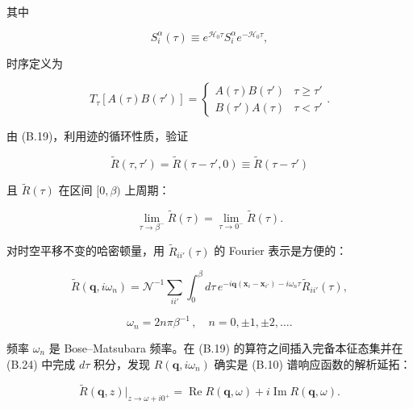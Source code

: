 其中

\begin{equation*}
S _ {i} ^ {\alpha} ( \tau ) \equiv e ^ {\mathcal {H} _ {0} \tau} S _ {i} ^ {\alpha} e ^ {- \mathcal {H} _ {0} \tau} ,
\tag{B.20}
\end{equation*}

时序定义为

\begin{equation*}
T _ {\tau} \left[ A ( \tau ) B ( \tau ' ) \right] = \left\{ \begin{array}{ll} A ( \tau ) B ( \tau ' ) & \tau \geq \tau ' \\ B ( \tau ' ) A ( \tau ) & \tau < \tau ' \end{array} \right..
\tag{B.21}
\end{equation*}

由 (B.19)，利用迹的循环性质，验证

\begin{equation*}
\tilde {R} ( \tau, \tau ' ) = \tilde {R} ( \tau - \tau ', 0 ) \equiv \tilde {R} ( \tau - \tau ' )
\tag{B.22}
\end{equation*}

且 $\tilde{R} (\tau)$ 在区间 $[0,\beta)$ 上周期：

\begin{equation*}
\lim_{\tau \rightarrow \beta ^ {-}} \tilde {R} ( \tau ) = \lim_{\tau \rightarrow 0 ^ {-}} \tilde {R} ( \tau ).
\tag{B.23}
\end{equation*}

对时空平移不变的哈密顿量，用 $\tilde{R}_{ii'}(\tau)$ 的 Fourier 表示是方便的：

\begin{equation*}
\tilde {R} ( \mathbf {q}, i\omega_ {n} ) = \mathcal {N} ^ {- 1} \sum_{ii'} \int_ {0} ^ {\beta} d \tau \, e ^ {- i \mathbf {q} ( \mathbf {x} _ {i} - \mathbf {x} _ {i'} ) - i\omega_{n} \tau} \tilde {R}_{ii'} ( \tau ) ,
\tag{B.24}
\end{equation*}

\begin{equation*}
\omega_ {n} = 2 n \pi \beta^ {- 1} \, , \quad n = 0, \pm 1, \pm 2, \dots .
\tag{B.25}
\end{equation*}

频率 $\omega_{n}$ 是 Bose--Matsubara 频率。在 (B.19) 的算符之间插入完备本征态集并在 (B.24) 中完成 $d\tau$ 积分，发现 $R(\mathbf{q}, i\omega_{n})$ 确实是 (B.10) 谱响应函数的解析延拓：

\begin{equation*}
\tilde {R} ( \mathbf {q}, z ) \Big|_{z \rightarrow \omega + i0 ^ {+}} = \operatorname{Re} R ( \mathbf {q}, \omega ) + i \operatorname{Im} R ( \mathbf {q}, \omega ).
\tag{B.26}
\end{equation*}

